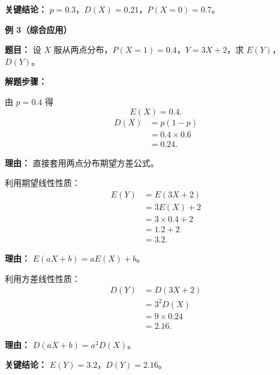 \begin{examplebox}
	\textbf{\textcolor{CExample}{关键结论：}}
	$p=0.3$，$D(X)=0.21$，$P(X=0)=0.7$。

	\medskip
	\textbf{\textcolor{CExample}{例 3（综合应用）}}

	\textbf{\textcolor{CExample}{题目：}}
	设 $X$ 服从两点分布，$P(X=1)=0.4$，$Y=3X+2$，求 $E(Y)$，$D(Y)$。

	\textbf{\textcolor{CExample}{解题步骤：}}
	\begin{description}[style=nextline, leftmargin=2.8em, labelsep=0.5em, itemsep=0.45em]
		\item[\textbf{第一步（求 $X$ 数字特征）：}] 由 $p=0.4$ 得
			\[
				E(X)=0.4.
			\]
			\[
				\begin{aligned}
					D(X) &= p(1-p) \\
					&= 0.4\times 0.6 \\
					&= 0.24.
			\end{aligned}
			\]
			\par\textbf{理由：} 直接套用两点分布期望方差公式。
		\item[\textbf{第二步（线性变换期望）：}] 利用期望线性性质：
			\[
				\begin{aligned}
					E(Y) &= E(3X+2) \\
					&= 3E(X)+2 \\
					&= 3\times 0.4 + 2 \\
					&= 1.2 + 2 \\
					&= 3.2.
			\end{aligned}
			\]
			\par\textbf{理由：} $E(aX+b)=aE(X)+b$。
		\item[\textbf{第三步（线性变换方差）：}] 利用方差线性性质：
			\[
				\begin{aligned}
					D(Y) &= D(3X+2) \\
					&= 3^2 D(X) \\
					&= 9\times 0.24 \\
					&= 2.16.
			\end{aligned}
			\]
			\par\textbf{理由：} $D(aX+b)=a^2 D(X)$。
	\end{description}

	\textbf{\textcolor{CExample}{关键结论：}}
	$E(Y)=3.2$，$D(Y)=2.16$。

\end{examplebox}
